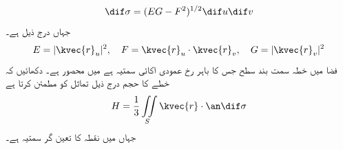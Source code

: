 \[\dif\sigma=(EG-F^2)^{1/2}\dif u\dif v\]
جہاں درج ذیل ہے۔
\[E=|\kvec{r}_u|^2,\quad F=\kvec{r}_u\cdot\kvec{r}_v,\quad G=|\kvec{r}_v|^2\]
 فضا میں    خطہ سمت بند سطح   جس  کا باہر رخ عمودی اکائی سمتیہ  ہے میں محصور ہے۔ دکھائیں کہ خطے کا حجم  درج ذیل تماثل کو مطمئن کرتا ہے
\[H=\frac{1}{3}\iint\limits_S\kvec{r}\cdot\an\dif\sigma\]
جہاں  میں نقطہ  کا تعین گر سمتیہ  ہے۔


